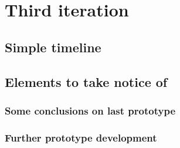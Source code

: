 \section{Third iteration}
\subsection{Simple timeline}\label{sec:3Iteration-timeline}


\subsection{Elements to take notice of}
\subsubsection*{Some conclusions on last prototype}

\subsubsection*{Further prototype development}